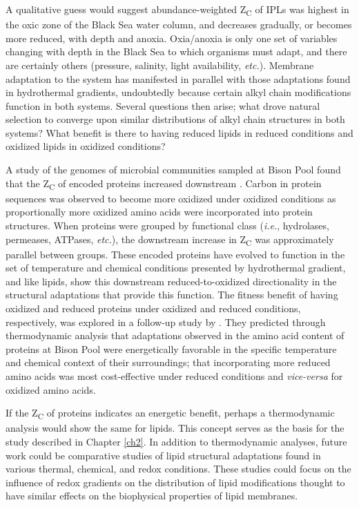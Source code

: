 A qualitative guess would suggest abundance-weighted Z\textsubscript{C} of IPLs was highest in the oxic zone of the Black Sea water column, and decreases gradually, or becomes more reduced, with depth and anoxia. Oxia/anoxia is only one set of variables changing with depth in the Black Sea to which organisms must adapt, and there are certainly others (pressure, salinity, light availability, \textit{etc.}). Membrane adaptation to the system has manifested in parallel with those adaptations found in hydrothermal gradients, undoubtedly because certain alkyl chain modifications function in both systems. Several questions then arise; what drove natural selection to converge upon similar distributions of alkyl chain structures in both systems? What benefit is there to having reduced lipids in reduced conditions and oxidized lipids in oxidized conditions?

A study of the genomes of microbial communities sampled at Bison Pool found that the Z\textsubscript{C} of encoded proteins increased downstream \citep{dick2011calculation}. Carbon in protein sequences was observed to become more oxidized under oxidized conditions as proportionally more oxidized amino acids were incorporated into protein structures. When proteins were grouped by functional class (\textit{i.e.}, hydrolases, permeases, ATPases, \textit{etc.}), the downstream increase in Z\textsubscript{C} was approximately parallel between groups. These encoded proteins have evolved to function in the set of temperature and chemical conditions presented by hydrothermal gradient, and like lipids, show this downstream reduced-to-oxidized directionality in the structural adaptations that provide this function. The fitness benefit of having oxidized and reduced proteins under oxidized and reduced conditions, respectively, was explored in a follow-up study by \cite{dick2013metastable}. They predicted through thermodynamic analysis that adaptations observed in the amino acid content of proteins at Bison Pool were energetically favorable in the specific temperature and chemical context of their surroundings; that incorporating more reduced amino acids was most cost-effective under reduced conditions and \textit{vice-versa} for oxidized amino acids.

If the Z\textsubscript{C} of proteins indicates an energetic benefit, perhaps a thermodynamic analysis would show the same for lipids. This concept serves as the basis for the study described in Chapter \ref{ch2}. In addition to thermodynamic analyses, future work could be comparative studies of lipid structural adaptations found in various thermal, chemical, and redox conditions. These studies could focus on the influence of redox gradients on the distribution of lipid modifications thought to have similar effects on the biophysical properties of lipid membranes.

